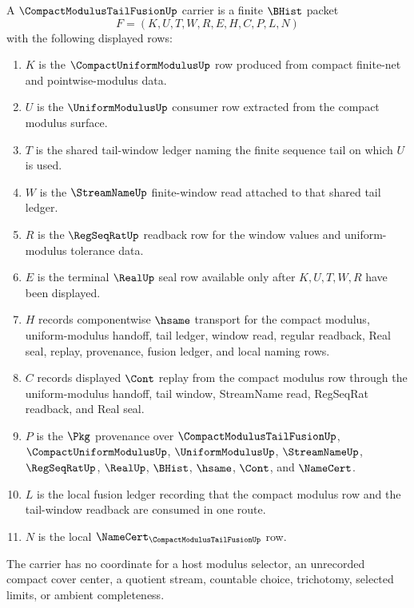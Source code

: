 \begin{definition}
\label{def:compact-modulus-tail-fusion-carrier}
A $\CompactModulusTailFusionUp$ carrier is a finite $\BHist$ packet
$$
F=(K,U,T,W,R,E,H,C,P,L,N)
$$
with the following displayed rows:
\begin{enumerate}
\item $K$ is the $\CompactUniformModulusUp$ row produced from compact finite-net and pointwise-modulus data.
\item $U$ is the $\UniformModulusUp$ consumer row extracted from the compact modulus surface.
\item $T$ is the shared tail-window ledger naming the finite sequence tail on which $U$ is used.
\item $W$ is the $\StreamNameUp$ finite-window read attached to that shared tail ledger.
\item $R$ is the $\RegSeqRatUp$ readback row for the window values and uniform-modulus tolerance data.
\item $E$ is the terminal $\RealUp$ seal row available only after $K,U,T,W,R$ have been displayed.
\item $H$ records componentwise $\hsame$ transport for the compact modulus, uniform-modulus handoff, tail ledger, window read, regular readback, Real seal, replay, provenance, fusion ledger, and local naming rows.
\item $C$ records displayed $\Cont$ replay from the compact modulus row through the uniform-modulus handoff, tail window, StreamName read, RegSeqRat readback, and Real seal.
\item $P$ is the $\Pkg$ provenance over $\CompactModulusTailFusionUp$, $\CompactUniformModulusUp$, $\UniformModulusUp$, $\StreamNameUp$, $\RegSeqRatUp$, $\RealUp$, $\BHist$, $\hsame$, $\Cont$, and $\NameCert$.
\item $L$ is the local fusion ledger recording that the compact modulus row and the tail-window readback are consumed in one route.
\item $N$ is the local $\NameCert_{\CompactModulusTailFusionUp}$ row.
\end{enumerate}
The carrier has no coordinate for a host modulus selector, an unrecorded compact cover center, a quotient stream, countable choice, trichotomy, selected limits, or ambient completeness.
\end{definition}

